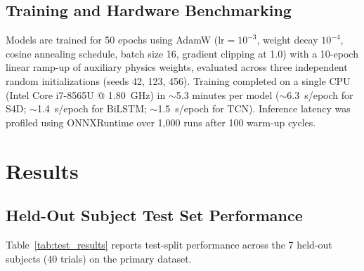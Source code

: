 \documentclass[journal]{IEEEtran}
\begin{document}
\subsection{Training and Hardware Benchmarking}
Models are trained for 50 epochs using AdamW ($\text{lr} = 10^{-3}$, weight decay $10^{-4}$, cosine annealing schedule, batch size 16, gradient clipping at 1.0) with a 10-epoch linear ramp-up of auxiliary physics weights, evaluated across three independent random initializations (seeds 42, 123, 456). Training completed on a single CPU (Intel Core i7-8565U @ 1.80~GHz) in ${\sim}$5.3 minutes per model (${\sim}$6.3~\si{\second}/epoch for S4D; ${\sim}$1.4~\si{\second}/epoch for BiLSTM; ${\sim}$1.5~\si{\second}/epoch for TCN). Inference latency was profiled using ONNXRuntime over 1,000 runs after 100 warm-up cycles.

\section{Results}

\subsection{Held-Out Subject Test Set Performance}
Table~\ref{tab:test_results} reports test-split performance across the 7 held-out subjects (40 trials) on the primary dataset.
\end{document}
